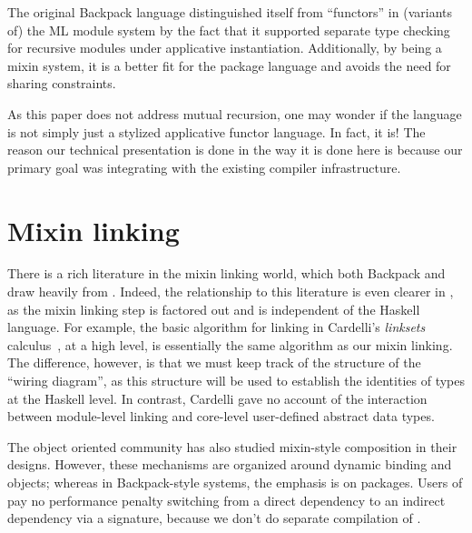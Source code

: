 The original Backpack language distinguished
itself from ``functors'' in (variants of) the ML module system
\cite{milner+:def-of-sml-revised,ocaml} by the fact that it supported
separate type checking for recursive modules under applicative
instantiation.  Additionally, by being a mixin system, it is a
better fit for the package language and avoids the need for
sharing constraints.

As this paper does not address mutual recursion, one may wonder
if the \unit{} language is not simply just a stylized applicative
functor language. In fact, it is!  The reason our technical presentation
is done in the way it is done here is because our primary goal
was integrating with the existing compiler infrastructure.

\section{Mixin linking}

There is a rich literature in the mixin
linking world, which both Backpack and \Backpack{} draw heavily from
\cite{ancona+:cms,flatt+:units,rossberg+:mixml}.  Indeed,
the relationship to this literature is even clearer in \Backpack{}, as
the mixin linking step is factored out and is independent of the
Haskell language.  For example, the basic algorithm for linking in
Cardelli's \emph{linksets} calculus~\cite{cardelli:linksets}, at a
high level, is essentially the same algorithm as our mixin linking.
The difference, however, is that we must keep track of the structure
of the ``wiring diagram'', as this structure will be used to establish
the identities of types at the Haskell level.  In contrast, Cardelli
gave no account of the interaction between module-level linking and
core-level user-defined abstract data types.

The object oriented community has also studied mixin-style composition
in their designs.  However, these mechanisms are organized around
dynamic binding and objects; whereas in Backpack-style systems,
the emphasis is on packages.  Users of \Backpack{} pay no performance
penalty switching from a direct dependency to an indirect dependency
via a signature, because we don't do separate compilation of \Backpack{}.








